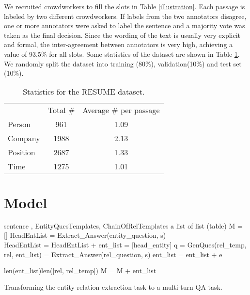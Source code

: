 \documentclass[11pt,a4paper]{article}
\begin{document}
We recruited crowdworkers to fill the slots in Table \ref{illustration}. 
Each passage is labeled by two different crowdworkers. 
If labels from the two annotators disagree, one or more annotators were asked to label the sentence and a majority vote was taken as the final decision.
Since the wording of the text is usually very explicit and formal, the inter-agreement between annotators is very high, achieving a value of 93.5\% for all slots. 
 Some statistics of the dataset are shown in Table \ref{resume}. We randomly split the dataset into training (80\%), validation(10\%) and test set (10\%). 
\begin{table}
\center
\small
\begin{tabular}{lcc} \hline
& Total \#  & Average \# per passage\\
Person&961 &1.09  \\
Company&1988  &2.13 \\
Position&2687 & 1.33 \\
Time&1275  & 1.01 \\\hline
\end{tabular}
\caption{Statistics for the RESUME dataset.}
\label{resume}
\end{table}


\section{Model}
\newcommand{\To}{{\bf to }}
\newcommand{\IF}{{\bf if }}
\newcommand{\DO}{{\bf do }}
\newcommand{\ENDIF}{{\bf endif}}
\begin{algorithm}[t]
\small
\begin{algorithmic}[1]
\Require sentence , 
 EntityQuesTemplates, ChainOfRelTemplates
\Ensure a list of list (table) M = []
\State
\State 
\State  HeadEntList
  \State  = Extract\_Answer(entity\_question, s)
  \State \IF   \DO \\ 
  \hspace{0.7cm}  HeadEntList = HeadEntList +  
   \State \ENDIF
 \EndFor
\State  ent\_list = [head\_entity]
\State q = GenQues(rel\_temp, rel, ent\_list)
     \State  = Extract\_Answer(rel\_question, s)
       \State \IF   
     \State\hspace{0.3cm}   ent\_list = ent\_list + e
     \State \ENDIF
     
\EndFor
 \EndFor
 \State \IF len(ent\_list)len([rel, rel\_temp])
  \State\hspace{0.3cm} M = M + ent\_list 
 \State\ENDIF
 \EndFor
 \State \Return 
\end{algorithmic}
\caption{Transforming the entity-relation extraction task to a multi-turn QA task.}
\label{alg}
\end{algorithm}
\end{document}
